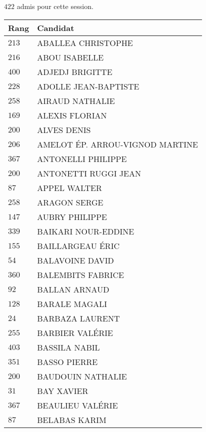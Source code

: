 




  $422$ admis pour cette session.

  \begin{xltabular}{\linewidth}{|l|X|}
    \hline
    \textbf{Rang} & \textbf{Candidat} \\
    \hline
    $213$ & ABALLEA CHRISTOPHE \\
    \hline
    $216$ & ABOU ISABELLE \\
    \hline
    $400$ & ADJEDJ BRIGITTE \\
    \hline
    $228$ & ADOLLE JEAN-BAPTISTE \\
    \hline
    $258$ & AIRAUD NATHALIE \\
    \hline
    $169$ & ALEXIS FLORIAN \\
    \hline
    $200$ & ALVES DENIS \\
    \hline
    $206$ & AMELOT ÉP. ARROU-VIGNOD MARTINE \\
    \hline
    $367$ & ANTONELLI PHILIPPE \\
    \hline
    $200$ & ANTONETTI RUGGI JEAN \\
    \hline
    $87$ & APPEL WALTER \\
    \hline
    $258$ & ARAGON SERGE \\
    \hline
    $147$ & AUBRY PHILIPPE \\
    \hline
    $339$ & BAIKARI NOUR-EDDINE \\
    \hline
    $155$ & BAILLARGEAU ÉRIC \\
    \hline
    $54$ & BALAVOINE DAVID \\
    \hline
    $360$ & BALEMBITS FABRICE \\
    \hline
    $92$ & BALLAN ARNAUD \\
    \hline
    $128$ & BARALE MAGALI \\
    \hline
    $24$ & BARBAZA LAURENT \\
    \hline
    $255$ & BARBIER VALÉRIE \\
    \hline
    $403$ & BASSILA NABIL \\
    \hline
    $351$ & BASSO PIERRE \\
    \hline
    $200$ & BAUDOUIN NATHALIE \\
    \hline
    $31$ & BAY XAVIER \\
    \hline
    $367$ & BEAULIEU VALÉRIE \\
    \hline
    $87$ & BELABAS KARIM \\

\end{xltabular}
